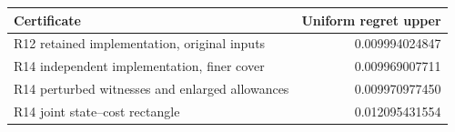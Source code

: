 \begin{tabular}{lr}
\toprule
Certificate & Uniform regret upper \\
\midrule
R12 retained implementation, original inputs & 0.009994024847 \\
R14 independent implementation, finer cover & 0.009969007711 \\
R14 perturbed witnesses and enlarged allowances & 0.009970977450 \\
R14 joint state--cost rectangle & 0.012095431554 \\
\bottomrule
\end{tabular}

